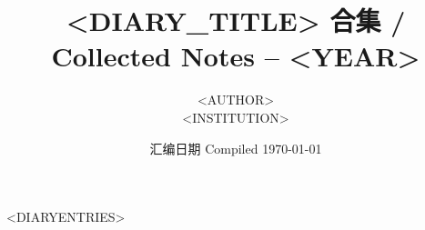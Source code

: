 \documentclass[letterpaper,11pt]{article}
\title{<DIARY_TITLE> 合集 / Collected Notes -- <YEAR>}
\author{<AUTHOR>\\<INSTITUTION>}
\date{汇编日期 Compiled \today}
\begin{document}
\tableofcontents
\thispagestyle{empty}
\newpage

<DIARYENTRIES>
\end{document}
